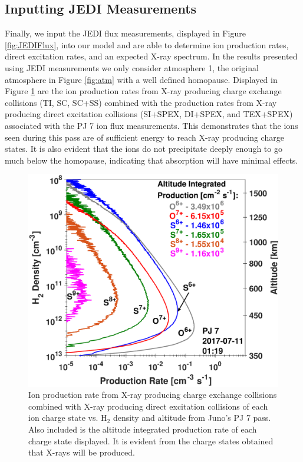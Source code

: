 \documentclass[draft]{agujournal2018}
\begin{document}
\subsection{Inputting JEDI Measurements}

Finally, we input the JEDI flux measurements, displayed in Figure \ref{fig:JEDIFlux}, into our model and are able to determine ion production rates, direct excitation rates, and an expected X-ray spectrum.
In the results presented using JEDI measurements we only consider atmosphere 1, the original atmosphere in Figure \ref{fig:atm} with a well defined homopause.
Displayed in Figure \ref{fig:JEDIIonProd} are the ion production rates from X-ray producing charge exchange collisions (TI, SC, SC+SS) combined with the production rates from X-ray producing direct excitation collisions (SI+SPEX, DI+SPEX, and TEX+SPEX) associated with the PJ 7 ion flux measurements.
This demonstrates that the ions seen during this pass are of sufficient energy to reach X-ray producing charge states.
It is also evident that the ions do not precipitate deeply enough to go much below the homopause, indicating that absorption will have minimal effects.

\begin{figure}[ht]
    \centering
    \includegraphics[width=\textwidth]{Figures/PJ7IonProd.eps}
    \caption{Ion production rate from X-ray producing charge exchange collisions combined with X-ray producing direct excitation collisions of each ion charge state vs. H$_2$ density and altitude from Juno's PJ 7 pass. Also included is the altitude integrated production rate of each charge state displayed. It is evident from the charge states obtained that X-rays will be produced.}
    \label{fig:JEDIIonProd}
\end{figure}
\end{document}
